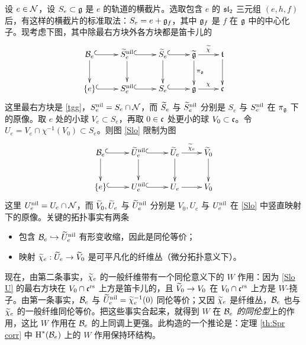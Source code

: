 设 $e\in\calN$，设 $S_{e}\subset \frg$ 是 $e$ 的轨道的横截片。选取包含 $e$ 的 $\sl_{2}$ 三元组 $(e,h,f)$ 后，有这样的横截片的标准取法：$S_{e}=e+\frg_{f}$，其中 $\frg_{f}$ 是 $f$ 在 $\frg$ 中的中心化子。现考虑下图，其中除最右方块外各方块都是笛卡儿的
\begin{equation}\label{Slo}
\xymatrix{\sB_{e}\ar[d]\ar@{^{(}->}[r] & \tilS^{\nil}_{e}\ar[d]\ar@{^{(}->}[r] & \tilS_{e}\ar[d]\ar@{^{(}->}[r] & \tg\ar[d]^{\pi_{\frg}}\ar[r]^{\wt\chi} & \frt\ar[d]\\
\{e\}\ar@{^{(}->}[r] & S^{\nil}_{e}\ar@{^{(}->}[r] & S_{e}\ar@{^{(}->}[r] & \frg\ar[r]^{\chi} & \frc}
\end{equation}
这里最右方块是 \eqref{tgg}，$S^{\nil}_{e}=S_{e}\cap\sN$，而 $\tilS_{e}$ 与 $\tilS^{\nil}_{e}$ 分别是 $S_{e}$ 与 $S^{\nil}_{e}$ 在 $\pi_{\frg}$ 下的原像。取 $e$ 处的小球 $V_{e}\subset S_{e}$，再取 $0\in\frc$ 处更小的球 $V_{0}\subset \frc$。令 $U_{e}=V_{e}\cap \chi^{-1}(V_{0})\subset S_{e}$。则图 \eqref{Slo} 限制为图
\begin{equation}\label{Slo U}
\xymatrix{\sB_{e}\ar[d]\ar@{^{(}->}[r] & \tilU^{\nil}_{e}\ar[d]\ar@{^{(}->}[r] & \tilU_{e}\ar[d]\ar[r]^{\wt\chi_{e}} & \tilV_{0}\ar[d]\\
\{e\}\ar@{^{(}->}[r] & U^{\nil}_{e}\ar@{^{(}->}[r] & U_{e}\ar[r] & V_{0}}
\end{equation}
这里 $U^{\nil}_{e}=U_{e}\cap\sN$，而 $\tilV_{0}, \tilU_{e}$ 与 $\tilU^{\nil}_{e}$ 分别是 $V_{0}, U_{e}$ 与 $U^{\nil}_{e}$ 在 \eqref{Slo} 中竖直映射下的原像。关键的拓扑事实有两条
\begin{itemize}
\item 包含 $\sB_{e}\incl \tilU^{\nil}_{e}$ 有形变收缩，因此是同伦等价；
\item 映射 $\wt\chi_{e}: \tilU_{e}\to \tilV_{0}$ 是可平凡化的纤维丛（微分拓扑意义下）。
\end{itemize}
现在，由第二条事实，$\wt\chi_{e}$ 的一般纤维带有一个同伦意义下的 $W$ 作用：因为 \eqref{Slo U} 的最右方块在 $V_{0}\cap\frc^{\rs}$ 上方是笛卡儿的，且 $\tilV_{0}\to V_{0}$ 在 $V_{0}\cap\frc^{\rs}$ 上方是 $W$-挠子。由第一条事实，$\sB_{e}$ 与 $\tilU^{\nil}_{e}=\wt\chi^{-1}_{e}(0)$ 同伦等价；又因 $\wt\chi_{e}$ 是纤维丛，$\sB_{e}$ 也与 $\wt\chi_{e}$ 的一般纤维同伦等价。把这些事实合起来，就得到 $W$ 在 {\em $\sB_{e}$ 的同伦型}上的作用，这比 $W$ 作用在 $\sB_{e}$ 的上同调上更强。此构造的一个推论是：定理 \ref{th:Spr corr} 中 $\cohog{*}{\sB_{e}}$ 上的 $W$ 作用保持环结构。

